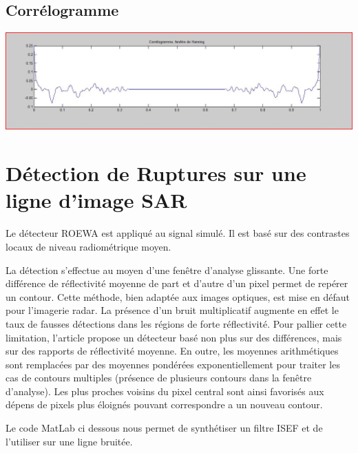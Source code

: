 \documentclass[a4paper,11pt]{article}
\newcommand{\FSource}[1]{%
  
  }
\begin{document}
\FSource{matlab/4.m}

\vspace{0.5cm}

\subsection{Corrélogramme}

\includegraphics[width=15cm]{capture/correlo.JPG}

\vspace{0.5cm}

\FSource{matlab/5.m}

\vspace{0.5cm}

\newpage

\section{Détection de Ruptures sur une ligne d'image SAR}

Le détecteur ROEWA est appliqué au signal simulé. Il est basé sur des contrastes locaux
de niveau radiométrique moyen.

La détection s'effectue au moyen d'une fenêtre d'analyse glissante. Une forte différence
de réflectivité moyenne de part et d'autre d'un pixel permet de repérer un contour. Cette
méthode, bien adaptée aux images optiques, est mise en défaut pour l'imagerie radar.
La présence d'un bruit multiplicatif augmente en effet le taux de fausses détections
dans les régions de forte réflectivité. Pour pallier cette limitation, l'article propose
un détecteur basé non plus sur des différences, mais sur des rapports de réflectivité
moyenne. En outre, les moyennes arithmétiques sont remplacées par des moyennes
pondérées exponentiellement pour traiter les cas de contours multiples (présence de
plusieurs contours dans la fenêtre d'analyse). Les plus proches voisins du pixel central sont 
ainsi favorisés aux dépens de pixels plus éloignés pouvant correspondre a un
nouveau contour.

Le code MatLab ci dessous nous permet de synthétiser un filtre ISEF et de l'utiliser sur une
ligne bruitée.
\end{document}
